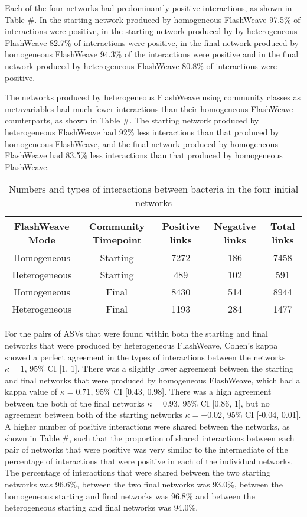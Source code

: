 \documentclass[11pt]{article}
\begin{document}
Each of the four networks had predominantly positive interactions, as shown in Table #. In the starting network produced by homogeneous FlashWeave 97.5\% of interactions were positive, in the starting network produced by by heterogeneous FlashWeave 82.7\% of interactions were positive, in the final network produced by homogeneous FlashWeave 94.3\% of the interactions were positive and in the final network produced by heterogeneous FlashWeave 80.8\% of interactions were positive. 

The networks produced by heterogeneous FlashWeave using community classes as metavariables had much fewer interactions than their homogeneous FlashWeave counterparts, as shown in Table #. The starting network produced by heterogeneous FlashWeave had 92\% less interactions than that produced by homogeneous FlashWeave, and the final network produced by homogeneous FlashWeave had 83.5\% less interactions than that produced by homogeneous FlashWeave.

\begin{table}[h]
\centering
\caption{Numbers and types of interactions between bacteria in the four initial networks}
\label{tab:sample}
\begin{tabular}{|c|c|c|c|c|}
\hline
FlashWeave Mode & Community Timepoint & Positive links & Negative links & Total links \\
\hline
Homogeneous & Starting & 7272 & 186 & 7458 \\
Heterogeneous & Starting & 489 & 102 & 591 \\
Homogeneous & Final & 8430 & 514 & 8944 \\
Heterogeneous & Final & 1193 & 284 & 1477 \\
\hline
\end{tabular}
\end{table}

For the pairs of ASVs that were found within both the starting and final networks that were produced by heterogeneous FlashWeave, Cohen's kappa showed a perfect agreement in the types of interactions between the networks \(\kappa = 1\), 95\% CI [1, 1]. There was a slightly lower agreement between the starting and final networks that were produced by homogeneous FlashWeave, which had a kappa value of \(\kappa = 0.71\), 95\% CI [0.43, 0.98]. There was a high agreement between the both of the final networks \(\kappa = 0.93\), 95\% CI [0.86, 1], but no agreement between both of the starting networks \(\kappa = -0.02\), 95\% CI [-0.04, 0.01]. A higher number of positive interactions were shared between the networks, as shown in Table #, such that the proportion of shared interactions between each pair of networks that were positive was very similar to the intermediate of the percentage of interactions that were positive in each of the individual networks. The percentage of interactions that were shared between the two starting networks was 96.6\%, between the two final networks was 93.0\%, between the homogeneous starting and final networks was 96.8\% and between the heterogeneous starting and final networks was 94.0\%.
\end{document}
